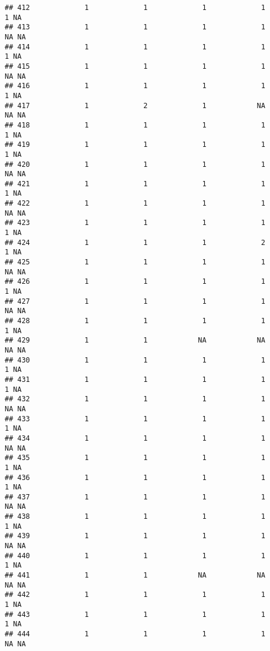 \documentclass[
]{article}
\begin{document}
\begin{verbatim}
## 412             1             1             1             1             1 NA
## 413             1             1             1             1            NA NA
## 414             1             1             1             1             1 NA
## 415             1             1             1             1            NA NA
## 416             1             1             1             1             1 NA
## 417             1             2             1            NA            NA NA
## 418             1             1             1             1             1 NA
## 419             1             1             1             1             1 NA
## 420             1             1             1             1            NA NA
## 421             1             1             1             1             1 NA
## 422             1             1             1             1            NA NA
## 423             1             1             1             1             1 NA
## 424             1             1             1             2             1 NA
## 425             1             1             1             1            NA NA
## 426             1             1             1             1             1 NA
## 427             1             1             1             1            NA NA
## 428             1             1             1             1             1 NA
## 429             1             1            NA            NA            NA NA
## 430             1             1             1             1             1 NA
## 431             1             1             1             1             1 NA
## 432             1             1             1             1            NA NA
## 433             1             1             1             1             1 NA
## 434             1             1             1             1            NA NA
## 435             1             1             1             1             1 NA
## 436             1             1             1             1             1 NA
## 437             1             1             1             1            NA NA
## 438             1             1             1             1             1 NA
## 439             1             1             1             1            NA NA
## 440             1             1             1             1             1 NA
## 441             1             1            NA            NA            NA NA
## 442             1             1             1             1             1 NA
## 443             1             1             1             1             1 NA
## 444             1             1             1             1            NA NA

\end{verbatim}
\end{document}
